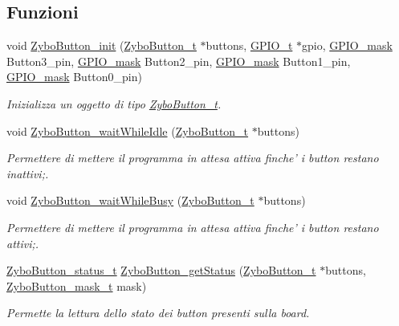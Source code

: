 \subsection*{Funzioni}
\begin{DoxyCompactItemize}
\item 
void \hyperlink{group___button_gaa40462223af93b0f5bdf2932400fe2a5}{Zybo\+Button\+\_\+init} (\hyperlink{struct_zybo_button__t}{Zybo\+Button\+\_\+t} $\ast$buttons, \hyperlink{struct_g_p_i_o__t}{G\+P\+I\+O\+\_\+t} $\ast$gpio, \hyperlink{group___g_p_i_o_ga6d5aef8a8a54ee2f602d47252ff66595}{G\+P\+I\+O\+\_\+mask} Button3\+\_\+pin, \hyperlink{group___g_p_i_o_ga6d5aef8a8a54ee2f602d47252ff66595}{G\+P\+I\+O\+\_\+mask} Button2\+\_\+pin, \hyperlink{group___g_p_i_o_ga6d5aef8a8a54ee2f602d47252ff66595}{G\+P\+I\+O\+\_\+mask} Button1\+\_\+pin, \hyperlink{group___g_p_i_o_ga6d5aef8a8a54ee2f602d47252ff66595}{G\+P\+I\+O\+\_\+mask} Button0\+\_\+pin)
\begin{DoxyCompactList}\small\item\em Inizializza un oggetto di tipo \hyperlink{struct_zybo_button__t}{Zybo\+Button\+\_\+t}. \end{DoxyCompactList}\item 
void \hyperlink{group___button_gaca30e81084e746785e395f79e9678e9a}{Zybo\+Button\+\_\+wait\+While\+Idle} (\hyperlink{struct_zybo_button__t}{Zybo\+Button\+\_\+t} $\ast$buttons)
\begin{DoxyCompactList}\small\item\em Permettere di mettere il programma in attesa attiva finche' i button restano inattivi;. \end{DoxyCompactList}\item 
void \hyperlink{group___button_ga3840edf011b5bad6302b7efc9c6326fe}{Zybo\+Button\+\_\+wait\+While\+Busy} (\hyperlink{struct_zybo_button__t}{Zybo\+Button\+\_\+t} $\ast$buttons)
\begin{DoxyCompactList}\small\item\em Permettere di mettere il programma in attesa attiva finche' i button restano attivi;. \end{DoxyCompactList}\item 
\hyperlink{group___button_ga85c290bfa232cab213e69200bf78e06a}{Zybo\+Button\+\_\+status\+\_\+t} \hyperlink{group___button_ga75407539e8ba0ad3ea142496219cd083}{Zybo\+Button\+\_\+get\+Status} (\hyperlink{struct_zybo_button__t}{Zybo\+Button\+\_\+t} $\ast$buttons, \hyperlink{group___button_ga4d26a5f6cad606de534ba034e0ba42dd}{Zybo\+Button\+\_\+mask\+\_\+t} mask)
\begin{DoxyCompactList}\small\item\em Permette la lettura dello stato dei button presenti sulla board. \end{DoxyCompactList}\end{DoxyCompactItemize}


